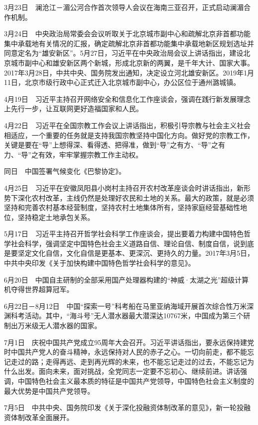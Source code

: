 \documentclass[10pt,a4paper,twocolumn]{book}
\begin{document}
3月23日　澜沧江－湄公河合作首次领导人会议在海南三亚召开，正式启动澜湄合作机制。

3月24日　中央政治局常委会会议听取关于北京城市副中心和疏解北京非首都功能集中承载地有关情况的汇报，确定疏解北京非首都功能集中承载地新区规划选址并同意定名为“雄安新区”。5月27日，习近平在中央政治局会议上讲话指出，建设北京城市副中心和雄安新区两个新城，形成北京新的两翼，是千年大计、国家大事。2017年3月28日，中共中央、国务院发出通知，决定设立河北雄安新区。2019年1月11日，北京市级行政中心正式迁入北京城市副中心，办公区位于通州潞城镇。

4月19日　习近平主持召开网络安全和信息化工作座谈会，强调在践行新发展理念上先行一步，让互联网更好造福国家和人民。

4月22日　习近平在全国宗教工作会议上讲话指出，积极引导宗教与社会主义社会相适应，一个重要的任务就是支持我国宗教坚持中国化方向。做好党的宗教工作，关键是要在“导”上想得深、看得透、把得准，做到“导”之有方、“导”之有力、“导”之有效，牢牢掌握宗教工作主动权。

同日　中国签署气候变化《巴黎协定》。

4月25日　习近平在安徽凤阳县小岗村主持召开农村改革座谈会时讲话指出，新形势下深化农村改革，主线仍然是处理好农民和土地的关系。最大的政策，就是必须坚持和完善农村基本经营制度，坚持农村土地集体所有，坚持家庭经营基础性地位，坚持稳定土地承包关系。

5月17日　习近平主持召开哲学社会科学工作座谈会，提出要着力构建中国特色哲学社会科学，强调坚定中国特色社会主义道路自信、理论自信、制度自信，说到底是要坚定文化自信，文化自信是更基本、更深沉、更持久的力量。2017年3月5日，中共中央印发《关于加快构建中国特色哲学社会科学的意见》。

6月20日　中国自主研制的全部采用国产处理器构建的“神威·太湖之光”超级计算机夺得世界超算冠军。

6月22日－8月12日　中国“探索一号”科考船在马里亚纳海域开展首次综合性万米深渊科考活动。其中，“海斗号”无人潜水器最大潜深达10767米，中国成为第三个研制出万米级无人潜水器的国家。

7月1日　庆祝中国共产党成立95周年大会召开。习近平讲话指出，要永远保持建党时中国共产党人的奋斗精神，永远保持对人民的赤子之心。一切向前走，都不能忘记走过的路；走得再远、走到再光辉的未来，也不能忘记走过的过去，不能忘记为什么出发。面向未来，面对挑战，全党同志一定要不忘初心、继续前进。讲话强调，中国特色社会主义最本质的特征是中国共产党领导，中国特色社会主义制度的最大优势是中国共产党领导。

7月5日　中共中央、国务院印发《关于深化投融资体制改革的意见》，新一轮投融资体制改革全面展开。
\end{document}
